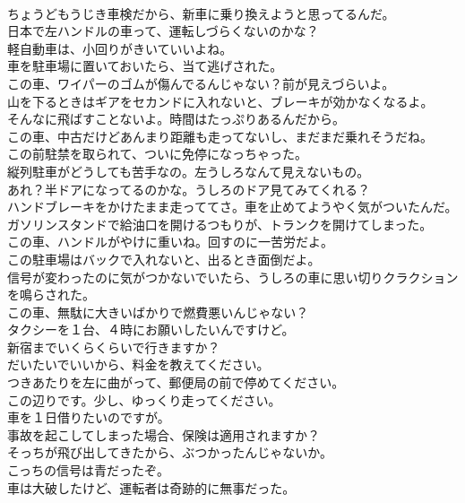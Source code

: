 \documentclass[8pt]{extreport}
\begin{document}
\begin{CJK}{UTF8}{min}
\\	ちょうどもうじき車検だから、新車に乗り換えようと思ってるんだ。	
\\	日本で左ハンドルの車って、運転しづらくないのかな？	
\\	軽自動車は、小回りがきいていいよね。	
\\	車を駐車場に置いておいたら、当て逃げされた。	
\\	この車、ワイパーのゴムが傷んでるんじゃない？前が見えづらいよ。	
\\	山を下るときはギアをセカンドに入れないと、ブレーキが効かなくなるよ。	
\\	そんなに飛ばすことないよ。時間はたっぷりあるんだから。	
\\	この車、中古だけどあんまり距離も走ってないし、まだまだ乗れそうだね。	
\\	この前駐禁を取られて、ついに免停になっちゃった。	
\\	縦列駐車がどうしても苦手なの。左うしろなんて見えないもの。	
\\	あれ？半ドアになってるのかな。うしろのドア見てみてくれる？	
\\	ハンドブレーキをかけたまま走っててさ。車を止めてようやく気がついたんだ。	
\\	ガソリンスタンドで給油口を開けるつもりが、トランクを開けてしまった。	
\\	この車、ハンドルがやけに重いね。回すのに一苦労だよ。	
\\	この駐車場はバックで入れないと、出るとき面倒だよ。	
\\	信号が変わったのに気がつかないでいたら、うしろの車に思い切りクラクションを鳴らされた。	
\\	この車、無駄に大きいばかりで燃費悪いんじゃない？	
\\	タクシーを１台、４時にお願いしたいんですけど。	
\\	新宿までいくらくらいで行きますか？	
\\	だいたいでいいから、料金を教えてください。	
\\	つきあたりを左に曲がって、郵便局の前で停めてください。	
\\	この辺りです。少し、ゆっくり走ってください。	
\\	車を１日借りたいのですが。	
\\	事故を起こしてしまった場合、保険は適用されますか？	
\\	そっちが飛び出してきたから、ぶつかったんじゃないか。	
\\	こっちの信号は青だったぞ。	
\\	車は大破したけど、運転者は奇跡的に無事だった。	

\end{CJK}
\end{document}
